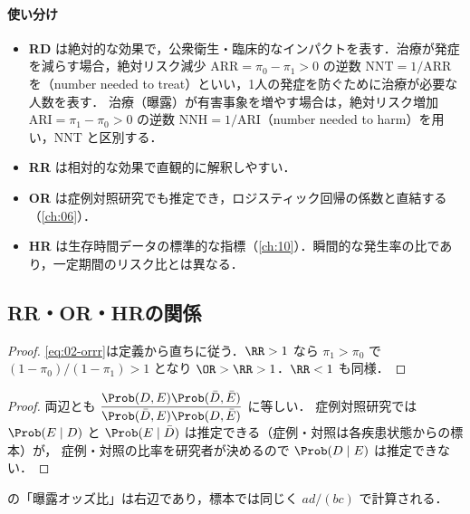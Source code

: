 \paragraph{使い分け}
\begin{itemize}
\item \textbf{RD} は絶対的な効果で，公衆衛生・臨床的なインパクトを表す．治療が発症を減らす場合，絶対リスク減少 $\mathrm{ARR}=\pi_0-\pi_1>0$ の逆数
      $\mathrm{NNT}=1/\mathrm{ARR}$ を（number needed to treat）といい，1人の発症を防ぐために治療が必要な人数を表す．
      治療（曝露）が有害事象を増やす場合は，絶対リスク増加 $\mathrm{ARI}=\pi_1-\pi_0>0$ の逆数 $\mathrm{NNH}=1/\mathrm{ARI}$（number needed to harm）を用い，NNT と区別する．
\item \textbf{RR} は相対的な効果で直観的に解釈しやすい．
\item \textbf{OR} は症例対照研究でも推定でき，ロジスティック回帰の係数と直結する（\cref{ch:06}）．
\item \textbf{HR} は生存時間データの標準的な指標（\cref{ch:10}）．瞬間的な発生率の比であり，一定期間のリスク比とは異なる．
\end{itemize}

\subsection{RR・OR・HRの関係}\label{subsec:02-relation}
\begin{proof}
\cref{eq:02-orrr}は定義から直ちに従う．$\RR>1$ なら $\pi_1>\pi_0$ で $(1-\pi_0)/(1-\pi_1)>1$ となり $\OR>\RR>1$．$\RR<1$ も同様．
\end{proof}

\begin{proof}
両辺とも $\dfrac{\Prob(D,E)\Prob(\bar D,\bar E)}{\Prob(\bar D,E)\Prob(D,\bar E)}$ に等しい．
症例対照研究では $\Prob(E\mid D)$ と $\Prob(E\mid\bar D)$ は推定できる（症例・対照は各疾患状態からの標本）が，
症例・対照の比率を研究者が決めるので $\Prob(D\mid E)$ は推定できない．
\end{proof}
 の「曝露オッズ比」は右辺であり，標本では同じく $ad/(bc)$ で計算される．

